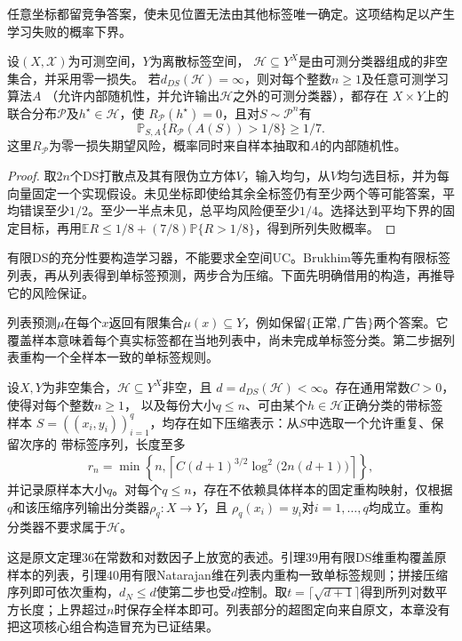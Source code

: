 任意坐标都留竞争答案，使未见位置无法由其他标签唯一确定。这项结构足以产生学习失败的概率下界。

\begin{theorem}[无限DS维的不可学习性]
\label{thm:infinite-ds-lower-bound}
设$(X,\mathcal X)$为可测空间，$Y$为离散标签空间，
$\mathcal H\subseteq Y^X$是由可测分类器组成的非空集合，并采用零一损失。
若$d_{DS}(\mathcal H)=\infty$，则对每个整数$n\geq1$及任意可测学习算法$A$
（允许内部随机性，并允许输出$\mathcal H$之外的可测分类器），都存在
$X\times Y$上的联合分布$\mathcal P$及$h^\star\in\mathcal H$，使
$R_{\mathcal P}(h^\star)=0$，且对$S\sim\mathcal P^n$有
\[
 \mathbb P_{S,A}\{R_{\mathcal P}(A(S))>1/8\}\geq1/7.
\]
这里$R_{\mathcal P}$为零一损失期望风险，概率同时来自样本抽取和$A$的内部随机性。
\end{theorem}

\begin{proof}
取$2n$个DS打散点及其有限伪立方体$V$，输入均匀，从$V$均匀选目标，并为每向量固定一个实现假设。未见坐标即使给其余全标签仍有至少两个等可能答案，平均错误至少$1/2$。至少一半点未见，总平均风险便至少$1/4$。选择达到平均下界的固定目标，再用$\mathbb E R\leq1/8+(7/8)\mathbb P\{R>1/8\}$，得到所列失败概率。
\end{proof}

有限DS的充分性要构造学习器，不能要求全空间UC。Brukhim等先重构有限标签列表，再从列表得到单标签预测，两步合为压缩。下面先明确借用的构造，再推导它的风险保证。

列表预测$\mu$在每个$x$返回有限集合$\mu(x)\subseteq Y$，例如保留$\{\text{正常},\text{广告}\}$两个答案。它覆盖样本意味着每个真实标签都在当地列表中，尚未完成单标签分类。第二步据列表重构一个全样本一致的单标签规则。

\begin{lemma}[有限DS维的压缩构造]
\label{lem:finite-ds-compression}
设$X,Y$为非空集合，$\mathcal H\subseteq Y^X$非空，且
$d=d_{DS}(\mathcal H)<\infty$。存在通用常数$C>0$，使得对每个整数$n\geq1$，
以及每份大小$q\leq n$、可由某个$h\in\mathcal H$正确分类的带标签样本
$S=((x_i,y_i))_{i=1}^q$，均存在如下压缩表示：从$S$中选取一个允许重复、保留次序的
带标签序列，长度至多
\[
 r_n=\min\!\left\{n,\left\lceil
 C(d+1)^{3/2}\log^2\!\bigl(2n(d+1)\bigr)\right\rceil\right\},
\]
并记录原样本大小$q$。对每个$q\leq n$，存在不依赖具体样本的固定重构映射，仅根据
$q$和该压缩序列输出分类器$\rho_q:X\to Y$，且
$\rho_q(x_i)=y_i$对$i=1,\ldots,q$均成立。重构分类器不要求属于$\mathcal H$。
\end{lemma}

这是原文定理36在常数和对数因子上放宽的表述。引理39用有限DS维重构覆盖原样本的列表，引理40用有限Natarajan维在列表内重构一致单标签规则；拼接压缩序列即可依次重构，$d_N\leq d$使第二步也受$d$控制。取$t=\lceil\sqrt{d+1}\rceil$得到所列对数平方长度；上界超过$n$时保存全样本即可。列表部分的超图定向来自原文，本章没有把这项核心组合构造冒充为已证结果。

